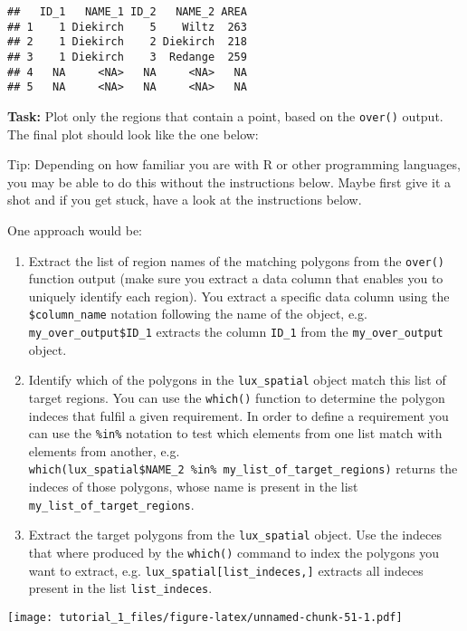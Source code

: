 \documentclass[]{article}
\begin{document}
\begin{verbatim}
##   ID_1   NAME_1 ID_2   NAME_2 AREA
## 1    1 Diekirch    5    Wiltz  263
## 2    1 Diekirch    2 Diekirch  218
## 3    1 Diekirch    3  Redange  259
## 4   NA     <NA>   NA     <NA>   NA
## 5   NA     <NA>   NA     <NA>   NA
\end{verbatim}

\textbf{Task:} Plot only the regions that contain a point, based on the
\texttt{over()} output. The final plot should look like the one below:

Tip: Depending on how familiar you are with R or other programming
languages, you may be able to do this without the instructions below.
Maybe first give it a shot and if you get stuck, have a look at the
instructions below.

One approach would be:

\begin{enumerate}
\def\labelenumi{\arabic{enumi}.}
\item
  Extract the list of region names of the matching polygons from the
  \texttt{over()} function output (make sure you extract a data column
  that enables you to uniquely identify each region). You extract a
  specific data column using the \texttt{\$column\_name} notation
  following the name of the object, e.g.
  \texttt{my\_over\_output\$ID\_1} extracts the column \texttt{ID\_1}
  from the \texttt{my\_over\_output} object.
\item
  Identify which of the polygons in the \texttt{lux\_spatial} object
  match this list of target regions. You can use the \texttt{which()}
  function to determine the polygon indeces that fulfil a given
  requirement. In order to define a requirement you can use the
  \texttt{\%in\%} notation to test which elements from one list match
  with elements from another, e.g.
  \texttt{which(lux\_spatial\$NAME\_2\ \%in\%\ my\_list\_of\_target\_regions)}
  returns the indeces of those polygons, whose name is present in the
  list \texttt{my\_list\_of\_target\_regions}.
\item
  Extract the target polygons from the \texttt{lux\_spatial} object. Use
  the indeces that where produced by the \texttt{which()} command to
  index the polygons you want to extract, e.g.
  \texttt{lux\_spatial{[}list\_indeces,{]}} extracts all indeces present
  in the list \texttt{list\_indeces}.
\end{enumerate}

\texttt{[image: tutorial\_1\_files/figure-latex/unnamed-chunk-51-1.pdf]}
\end{document}
